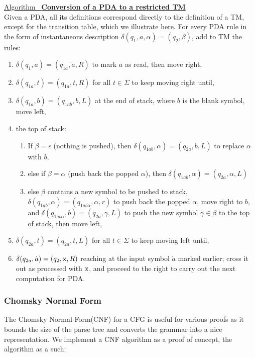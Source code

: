 \documentclass[12pt]{article}  %
\newcommand{\algtitle}[1]{\underline{Algorithm \ {\bf #1}} \vspace*{1mm}\\}
\begin{document}
\algtitle{Conversion of a PDA to a restricted TM}
Given a PDA, all its definitions correspond directly to the definition of a TM, except for the transition table, which we illustrate here. For every PDA rule in the form of instantaneous description $\delta(q_1, a, \alpha) = (q_2, \beta)$, add to TM the rules:
\begin{enumerate}
	\item $\delta(q_1, a) = (q_{1a}, \dot a, R)$ to mark $a$ as read, then move right,
	\item $\delta(q_{1a}, t) = (q_{1a}, t, R)$ for all $t \in \Sigma$ to keep moving right until,
	\item $\delta(q_{1a}, b) = (q_{1ab}, b, L)$ at the end of stack, where $b$ is the blank symbol, move left,
	\item the top of stack:
	\begin{enumerate}
		\item If $\beta = \epsilon$ (nothing is pushed), then $\delta(q_{1ab}, \alpha) = (q_{2a}, b, L)$ to replace $\alpha$ with $b$,
		\item else if $\beta = \alpha$ (push back the popped $\alpha$), then $\delta(q_{1ab}, \alpha) = (q_{2a}, \alpha, L)$
		\item else $\beta$ contains a new symbol to be pushed to stack, $\delta(q_{1ab}, \alpha) = (q_{1ab\alpha}, \alpha, r)$ to push back the popped $\alpha$, move right to $b$, and $\delta(q_{1ab\alpha}, b) = (q_{2a}, \gamma, L)$ to push the new symbol $\gamma \in \beta$ to the top of stack, then move left,
	\end{enumerate}
	\item $\delta(q_{2a}, t) = (q_{2a}, t, L)$ for all $t \in \Sigma$ to keep moving left until,
	\item $\delta(q_{2a}, \dot a) = (q_{2}, {\tt x}, R)$ reaching at the input symbol $\dot a$ marked earlier; cross it out as processed with ${\tt x}$, and proceed to the right to carry out the next computation for PDA.	
\end{enumerate}




\subsubsection{Chomsky Normal Form}
The Chomsky Normal Form(CNF) for a CFG is useful for various proofs as it bounds the size of the parse tree and converts the grammar into a nice representation. We implement a CNF algorithm as a proof of concept, the algorithm as a such:
\end{document}
